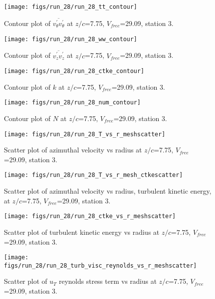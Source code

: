 \begin{figure}[H]
\centering
\texttt{[image: figs/run\_28/run\_28\_tt\_contour]}
\caption{Contour plot of $\overline{v_{\theta}^{\prime} v_{\theta}^{\prime}}$ at $z/c$=7.75, $V_{free}$=29.09, station 3.}
\end{figure}


\begin{figure}[H]
\centering
\texttt{[image: figs/run\_28/run\_28\_ww\_contour]}
\caption{Contour plot of $\overline{v_{z}^{\prime} v_{z}^{\prime}}$ at $z/c$=7.75, $V_{free}$=29.09, station 3.}
\end{figure}


\begin{figure}[H]
\centering
\texttt{[image: figs/run\_28/run\_28\_ctke\_contour]}
\caption{Contour plot of $k$ at $z/c$=7.75, $V_{free}$=29.09, station 3.}
\end{figure}


\begin{figure}[H]
\centering
\texttt{[image: figs/run\_28/run\_28\_num\_contour]}
\caption{Contour plot of $N$ at $z/c$=7.75, $V_{free}$=29.09, station 3.}
\end{figure}


\begin{figure}[H]
\centering
\texttt{[image: figs/run\_28/run\_28\_T\_vs\_r\_meshscatter]}
\caption{Scatter plot of azimuthal velocity vs radius at $z/c$=7.75, $V_{free}$=29.09, station 3.}
\end{figure}


\begin{figure}[H]
\centering
\texttt{[image: figs/run\_28/run\_28\_T\_vs\_r\_mesh\_ctkescatter]}
\caption{Scatter plot of azimuthal velocity vs radius, turbulent kinetic energy, at $z/c$=7.75, $V_{free}$=29.09, station 3.}
\end{figure}


\begin{figure}[H]
\centering
\texttt{[image: figs/run\_28/run\_28\_ctke\_vs\_r\_meshscatter]}
\caption{Scatter plot of turbulent kinetic energy vs radius at $z/c$=7.75, $V_{free}$=29.09, station 3.}
\end{figure}


\begin{figure}[H]
\centering
\texttt{[image: figs/run\_28/run\_28\_turb\_visc\_reynolds\_vs\_r\_meshscatter]}
\caption{Scatter plot of $
u_T$ reynolds stress term vs radius at $z/c$=7.75, $V_{free}$=29.09, station 3.}
\end{figure}


